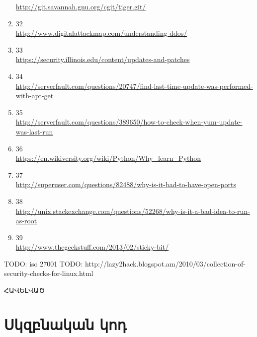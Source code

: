 \documentclass[a4paper,12pt]{article}
\begin{document}
\begin{sloppypar}
\begin{enumerate}
	\url{http://git.savannah.gnu.org/cgit/tiger.git/}
\item 32 \\
	\url{http://www.digitalattackmap.com/understanding-ddos/}
\item 33 \\
	\url{https://security.illinois.edu/content/updates-and-patches}
\item 34 \\
	\url{http://serverfault.com/questions/20747/find-last-time-update-was-performed-with-apt-get}
\item 35 \\
	\url{http://serverfault.com/questions/389650/how-to-check-when-yum-update-was-last-run}
\item 36 \\
	\url{https://en.wikiversity.org/wiki/Python/Why\_learn\_Python}
\item 37 \\
	\url{http://superuser.com/questions/82488/why-is-it-bad-to-have-open-ports}
\item 38 \\
	\url{http://unix.stackexchange.com/questions/52268/why-is-it-a-bad-idea-to-run-as-root}
\item 39 \\
	\url{http://www.thegeekstuff.com/2013/02/sticky-bit/}
\end{enumerate}


TODO: iso 27001
TODO: http://lazy2hack.blogspot.am/2010/03/collection-of-security-checks-for-linux.html




\newpage
\vspace*{\fill}
\begingroup
\centering
\centerline{\Huge{ՀԱՎԵԼՎԱԾ}}
\endgroup
\vspace*{\fill}
\newpage


\section*{Սկզբնական կոդ}




















\end{sloppypar}
\end{document}
